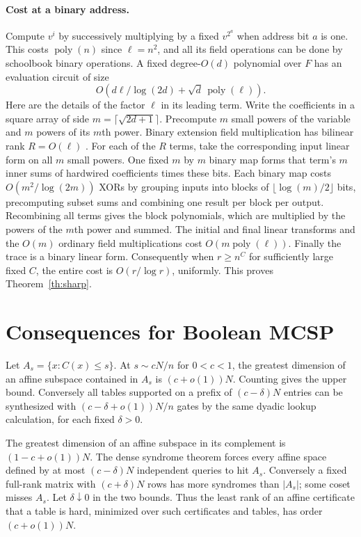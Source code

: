 \documentclass[11pt]{article}
\begin{document}
\paragraph{Cost at a binary address.}
Compute $v^i$ by successively multiplying by a fixed $v^{2^a}$ when address bit $a$ is one. This costs $\operatorname{poly}(n)$ since $\ell=n^2$, and all its field operations can be done by schoolbook binary operations. A fixed degree-$O(d)$ polynomial over $F$ has an evaluation circuit of size
\[
                    O(d\ell/\log(2d)+\sqrt d\,\operatorname{poly}(\ell)).
\]
Here are the details of the factor $\ell$ in its leading term. Write the coefficients in a square array of side $m=\lceil\sqrt{2d+1}\rceil$. Precompute $m$ small powers of the variable and $m$ powers of its $m$th power. Binary extension field multiplication has bilinear rank $R=O(\ell)$ \cite{rank}. For each of the $R$ terms, take the corresponding input linear form on all $m$ small powers. One fixed $m$ by $m$ binary map forms that term's $m$ inner sums of hardwired coefficients times these bits. Each binary map costs $O(m^2/\log(2m))$ XORs by grouping inputs into blocks of $\lfloor\log(m)/2\rfloor$ bits, precomputing subset sums and combining one result per block per output. Recombining all terms gives the block polynomials, which are multiplied by the powers of the $m$th power and summed. The initial and final linear transforms and the $O(m)$ ordinary field multiplications cost $O(m\operatorname{poly}(\ell))$. Finally the trace is a binary linear form. Consequently when $r\ge n^C$ for sufficiently large fixed $C$, the entire cost is $O(r/\log r)$, uniformly. This proves Theorem~\ref{th:sharp}.

\section{Consequences for Boolean MCSP}
Let $A_s=\{x:C(x)\le s\}$. At $s\sim cN/n$ for $0<c<1$, the greatest dimension of an affine subspace contained in $A_s$ is $(c+o(1))N$. Counting gives the upper bound. Conversely all tables supported on a prefix of $(c-\delta)N$ entries can be synthesized with $(c-\delta+o(1))N/n$ gates by the same dyadic lookup calculation, for each fixed $\delta>0$.

The greatest dimension of an affine subspace in its complement is $(1-c+o(1))N$. The dense syndrome theorem forces every affine space defined by at most $(c-\delta)N$ independent queries to hit $A_s$. Conversely a fixed full-rank matrix with $(c+\delta)N$ rows has more syndromes than $|A_s|$; some coset misses $A_s$. Let $\delta\downarrow0$ in the two bounds. Thus the least rank of an affine certificate that a table is hard, minimized over such certificates and tables, has order $(c+o(1))N$.
\end{document}
